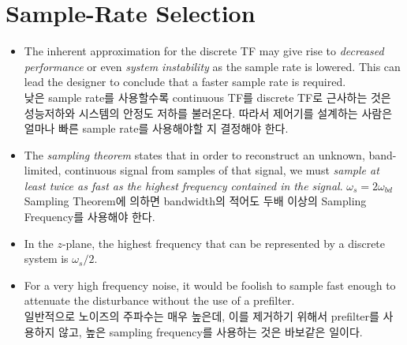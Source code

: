 \section{Sample-Rate Selection}
%
\begin{itemize}
	\item The inherent approximation for the discrete TF may give rise to \emph{decreased performance} or even \emph{system instability} as the sample rate is lowered. This can lead the designer to conclude that a faster sample rate is required. \\
    낮은 sample rate를 사용할수록 continuous TF를 discrete TF로 근사하는 것은 성능저하와 시스템의 안정도 저하를 불러온다. 따라서 제어기를 설계하는 사람은 얼마나 빠른 sample rate를 사용해야할 지 결정해야 한다.
	\item The \emph{sampling theorem} states that in order to reconstruct an unknown, band-limited, continuous signal from samples of that signal, we must \emph{sample at least twice as fast as the highest frequency contained in the signal}. $\omega_s = 2 \omega_{bd}$\\
	Sampling Theorem에 의하면 bandwidth의 적어도 두배 이상의 Sampling Frequency를 사용해야 한다. 

	\item In the $z$-plane, the highest frequency that can be represented by a discrete system is $\omega_s/2$. 
	\item For a very high frequency noise, it would be foolish to sample fast enough to attenuate the disturbance without the use of a prefilter. \\
	일반적으로 노이즈의 주파수는 매우 높은데, 이를 제거하기 위해서 prefilter를 사용하지 않고, 높은 sampling frequency를 사용하는 것은 바보같은 일이다. 
\end{itemize}
%
%
\newpage
%
